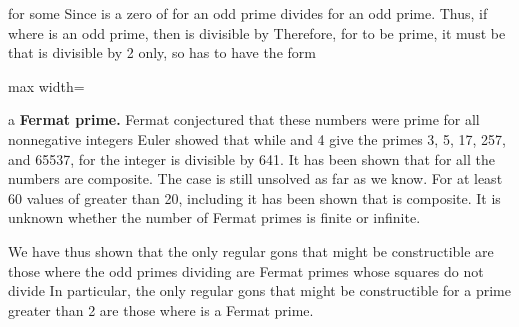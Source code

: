 \documentclass[11pt,oneside]{article}
\begin{document}
\begin{BookBody}
\noindent for some  Since  is a zero of  for  an odd prime divides  for  an odd prime. Thus, if  where  is an odd prime, then  is divisible by  Therefore, for  to be prime, it must be that  is divisible by 2 only, so  has to have the form

\begin{center}\begin{adjustbox}{max width=\linewidth}\end{adjustbox}\end{center}

\noindent a\textbf{ Fermat prime.} Fermat conjectured that these numbers  were prime for all nonnegative integers  Euler showed that while  and 4 give the primes 3, 5, 17, 257, and 65537, for  the integer  is divisible by 641. It has been shown that for  all the numbers  are composite. The case  is still unsolved as far as we know. For at least 60 values of  greater than 20, including  it has been shown that  is composite. It is unknown whether the number of Fermat primes is finite or infinite.

We have thus shown that the only regular gons that might be constructible are those where the odd primes dividing  are Fermat primes whose squares do not divide  In particular, the only regular gons that might be constructible for  a prime greater than 2 are those where  is a Fermat prime.

\end{BookBody}

\BookNarrativetrue
\end{document}
